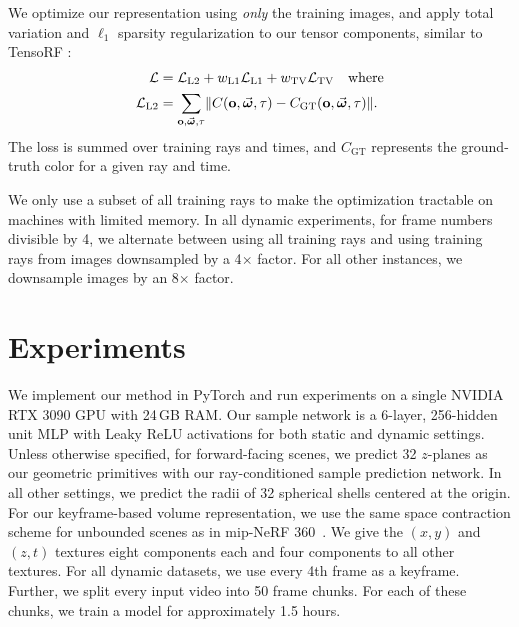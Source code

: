 \documentclass[10pt,twocolumn,letterpaper]{article}
\makeatletter
\renewcommand\paragraph{\@startsection{paragraph}{4}{\z@}{0.75ex \@plus.5ex \@minus.2ex}{-1em}{\normalfont\normalsize\bfseries\maybe@addperiod}}
\newcommand{\maybe@addperiod}[1]{#1\@addpunct{.}}
\makeatother
\begin{document}
We optimize our representation using \textit{only} the training images, and apply total variation and $\ell_1$ sparsity regularization to our tensor components, similar to TensoRF \cite{ChenXGYS2022}:
\begin{align}
    \mathcal{L} &= \mathcal{L}_\text{L2} + w_\text{L1} \mathcal{L}_\text{L1} + w_\text{TV} \mathcal{L}_\text{TV} \quad \text{where} \label{eq:loss} \\
    \mathcal{L}_\text{L2} &= \sum_{\mathbf{o}, \vec{\boldsymbol{\omega}}, \tau} \lVert C(\mathbf{o}, \vec{\boldsymbol{\omega}}, \tau) - C_\text{GT}(\mathbf{o}, \vec{\boldsymbol{\omega}}, \tau) \rVert \text{.}
\end{align}
The loss is summed over training rays and times, and $C_\text{GT}$ represents the ground-truth color for a given ray and time.

We only use a subset of all training rays to make the optimization tractable on machines with limited memory.
In all dynamic experiments, for frame numbers divisible by 4, we alternate between using all training rays and using training rays from images downsampled by a 4$\times$ factor.
For all other instances, we downsample images by an 8$\times$ factor.


 \section{Experiments}
\label{sec:experiments}

\paragraph{Implementation Details}
We implement our method in PyTorch \cite{PaszkGMLBCKLGADKYDRTCSFBC2019} and run experiments on a single NVIDIA RTX 3090 GPU with 24\,GB RAM.
Our sample network is a 6-layer, 256-hidden unit MLP with Leaky ReLU activations for both static and dynamic settings. 
Unless otherwise specified, for forward-facing scenes, we predict 32 $z$-planes as our geometric primitives with our ray-conditioned sample prediction network. 
In all other settings, we predict the radii of 32 spherical shells centered at the origin. 
For our keyframe-based volume representation, we use the same space contraction scheme for unbounded scenes as in mip-NeRF 360~\cite{BarroMVSH2022}. We give the $(x, y)$ and $(z, t)$ textures eight components each and four components to all other textures.
For all dynamic datasets, we use every 4th frame as a keyframe.
Further, we split every input video into 50 frame chunks. For each of these chunks, we train a model for approximately 1.5 hours.
\end{document}
